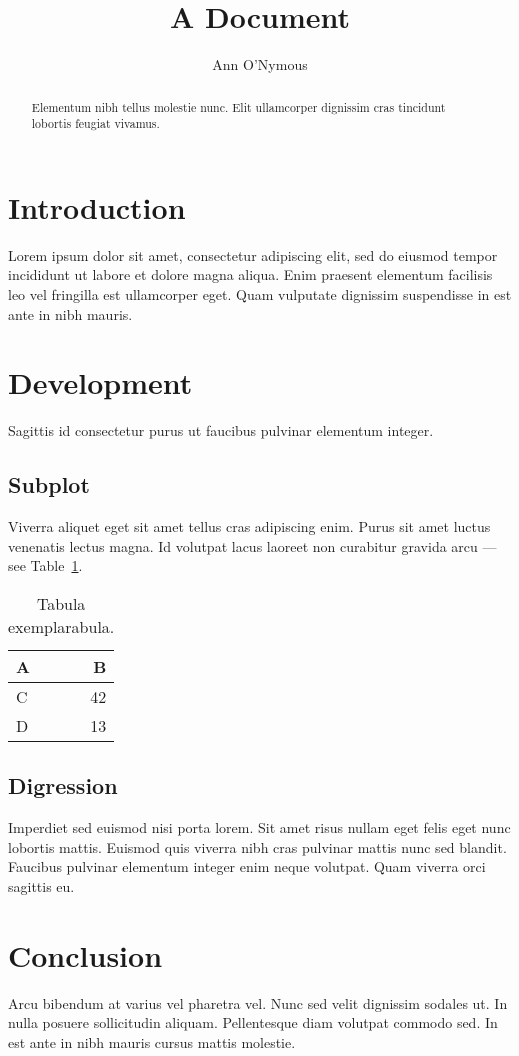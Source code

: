 \documentclass{article}
\title{A Document}
\author{Ann O'Nymous}
\begin{document}
\maketitle

\begin{abstract}
Elementum nibh tellus molestie nunc. Elit ullamcorper dignissim cras tincidunt lobortis feugiat vivamus.
\end{abstract}

\section{Introduction}

Lorem ipsum dolor sit amet, consectetur adipiscing elit, sed do eiusmod tempor incididunt ut labore et dolore magna aliqua. Enim praesent elementum facilisis leo vel fringilla est ullamcorper eget. Quam vulputate dignissim suspendisse in est ante in nibh mauris. 

\section{Development}

Sagittis id consectetur purus ut faucibus pulvinar elementum integer.

\subsection{Subplot}

Viverra aliquet eget sit amet tellus cras adipiscing enim. Purus sit amet luctus venenatis lectus magna. Id volutpat lacus laoreet non curabitur gravida arcu --- see Table~\ref{tab:widgets}.

\begin{table}[h]
\centering
\begin{tabular}{l|r}
A & B \\\hline
C & 42 \\
D & 13
\end{tabular}
\caption{\label{tab:widgets}Tabula exemplarabula.}
\end{table}

\subsection{Digression}

Imperdiet sed euismod nisi porta lorem. Sit amet risus nullam eget felis eget nunc lobortis mattis. Euismod quis viverra nibh cras pulvinar mattis nunc sed blandit. Faucibus pulvinar elementum integer enim neque volutpat. Quam viverra orci sagittis eu.

\section{Conclusion}

Arcu bibendum at varius vel pharetra vel. Nunc sed velit dignissim sodales ut. In nulla posuere sollicitudin aliquam. Pellentesque diam volutpat commodo sed. In est ante in nibh mauris cursus mattis molestie. 

% 
% 
\end{document}

